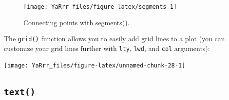 \documentclass[]{book}
\newenvironment{Shaded}{\begin{snugshade}}{\end{snugshade}}
\newcommand{\KeywordTok}[1]{\textcolor[rgb]{0.13,0.29,0.53}{\textbf{{#1}}}}
\newcommand{\DataTypeTok}[1]{\textcolor[rgb]{0.13,0.29,0.53}{{#1}}}
\newcommand{\DecValTok}[1]{\textcolor[rgb]{0.00,0.00,0.81}{{#1}}}
\newcommand{\StringTok}[1]{\textcolor[rgb]{0.31,0.60,0.02}{{#1}}}
\newcommand{\CommentTok}[1]{\textcolor[rgb]{0.56,0.35,0.01}{\textit{{#1}}}}
\newcommand{\NormalTok}[1]{{#1}}
\theoremstyle{definition}
\theoremstyle{definition}
\theoremstyle{remark}
\begin{document}
\begin{figure}

{\centering \texttt{[image: YaRrr\_files/figure-latex/segments-1]} 

}

\caption{Connecting points with segments().}\label{fig:segments}
\end{figure}

The \texttt{grid()} function allows you to easily add grid lines to a
plot (you can customize your grid lines further with \texttt{lty},
\texttt{lwd}, and \texttt{col} arguments):

\begin{Shaded}
\end{Shaded}

\begin{center}\texttt{[image: YaRrr\_files/figure-latex/unnamed-chunk-28-1]} \end{center}

\subsection{\texorpdfstring{\texttt{text()}}{text()}}\label{text}
\end{document}
